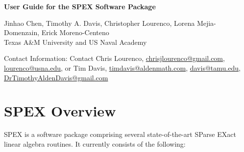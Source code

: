 \documentclass[12pt,oneside]{book}
\theoremstyle{definition}
\begin{document}
\thispagestyle{empty}
\begin{center}\begin{large}
    \vspace{1in}
    \textbf{User Guide for the SPEX Software Package} \\
    \vspace{5mm}
    
 
    \vspace{20mm}
    
    Jinhao Chen, Timothy A. Davis, Christopher Lourenco, Lorena Mejia-Domenzain, Erick Moreno-Centeno \\
    Texas A\&M University and US Naval Academy
    \vspace{20mm}
    
    Contact Information: Contact Chris Lourenco, \href{mailto:chrisjlourenco@gmail.com}{chrisjlourenco@gmail.com}, \href{mailto:lourenco@usna.edu}{lourenco@usna.edu}, or Tim Davis,
    \href{mailto:timdavis@aldenmath.com}{timdavis@aldenmath.com},
    \href{mailto:davis@tamu.edu}{davis@tamu.edu},
    \href{DrTimothyAldenDavis@gmail.com}{DrTimothyAldenDavis@gmail.com}
\end{large}\end{center}



\newpage
\makeatletter{}\makeatother%


\chapter{SPEX Overview}\vspace{-0.75in}
SPEX is a software package comprising several state-of-the-art SParse EXact
linear algebra routines. It currently consists of the following:
\end{document}
